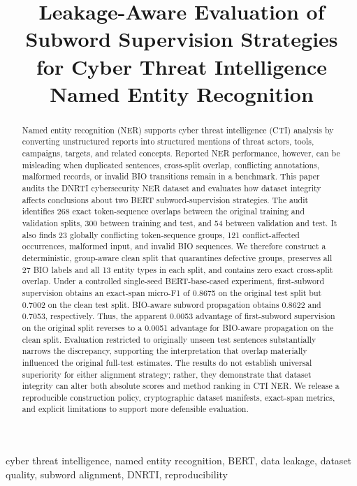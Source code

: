 \documentclass[conference]{IEEEtran}
\title{Leakage-Aware Evaluation of Subword Supervision Strategies\\
for Cyber Threat Intelligence Named Entity Recognition}
\author{\IEEEauthorblockN{Ammar Aikan, Alaaldeen AL-Shuwaie, and Munif AL-Omisi}
\IEEEauthorblockA{University of Science and Technology--Yemen\\
Sana'a, Republic of Yemen\\
Email address(es)---to be added before submission}}
\begin{document}
\maketitle

\begin{abstract}
Named entity recognition (NER) supports cyber threat intelligence (CTI) analysis by converting unstructured reports into structured mentions of threat actors, tools, campaigns, targets, and related concepts. Reported NER performance, however, can be misleading when duplicated sentences, cross-split overlap, conflicting annotations, malformed records, or invalid BIO transitions remain in a benchmark. This paper audits the DNRTI cybersecurity NER dataset and evaluates how dataset integrity affects conclusions about two BERT subword-supervision strategies. The audit identifies 268 exact token-sequence overlaps between the original training and validation splits, 300 between training and test, and 54 between validation and test. It also finds 23 globally conflicting token-sequence groups, 121 conflict-affected occurrences, malformed input, and invalid BIO sequences. We therefore construct a deterministic, group-aware clean split that quarantines defective groups, preserves all 27 BIO labels and all 13 entity types in each split, and contains zero exact cross-split overlap. Under a controlled single-seed BERT-base-cased experiment, first-subword supervision obtains an exact-span micro-F1 of 0.8675 on the original test split but 0.7002 on the clean test split. BIO-aware subword propagation obtains 0.8622 and 0.7053, respectively. Thus, the apparent 0.0053 advantage of first-subword supervision on the original split reverses to a 0.0051 advantage for BIO-aware propagation on the clean split. Evaluation restricted to originally unseen test sentences substantially narrows the discrepancy, supporting the interpretation that overlap materially influenced the original full-test estimates. The results do not establish universal superiority for either alignment strategy; rather, they demonstrate that dataset integrity can alter both absolute scores and method ranking in CTI NER. We release a reproducible construction policy, cryptographic dataset manifests, exact-span metrics, and explicit limitations to support more defensible evaluation.
\end{abstract}

\begin{IEEEkeywords}
cyber threat intelligence, named entity recognition, BERT, data leakage, dataset quality, subword alignment, DNRTI, reproducibility
\end{IEEEkeywords}
\end{document}
